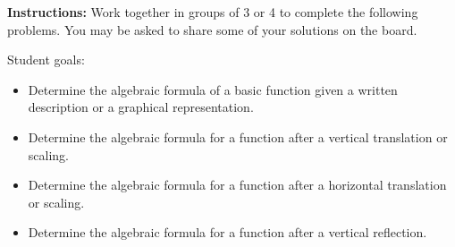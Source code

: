 




\noindent \textbf{Instructions:} Work together in groups of 3 or 4 to
complete the following problems.  You may be asked to share some of
your solutions on the board.


\noindent
Student goals:
  \begin{itemize}
  \item Determine the algebraic formula of a basic function given a
    written description or a graphical representation.
  \item Determine the algebraic formula for a function after a vertical translation or scaling.
  \item Determine the algebraic formula for a function after a
    horizontal translation or scaling.
  \item Determine the algebraic formula for a function after a vertical reflection.
  \end{itemize}


